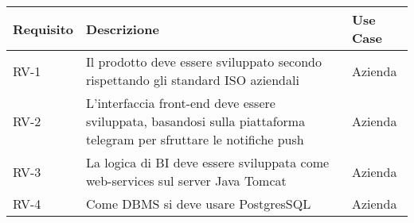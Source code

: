 \begin{tabular}{ |p{2cm}|p{8cm}|p{2cm}| }
 

 \hline
\textbf{ Requisito}   &  \textbf{Descrizione}    &  \textbf{    Use Case} \\ 
\hline

RV-1 &  Il prodotto deve essere sviluppato secondo rispettando  gli standard ISO aziendali & Azienda \\
\hline
RV-2 &  L’interfaccia front-end deve essere sviluppata, basandosi sulla piattaforma telegram per sfruttare le notifiche push  & Azienda \\
\hline
RV-3 &  La logica di BI deve essere sviluppata come web-services sul server Java Tomcat& Azienda \\
\hline
RV-4 & Come DBMS si deve usare PostgresSQL & Azienda \\
\hline
\end{tabular}











